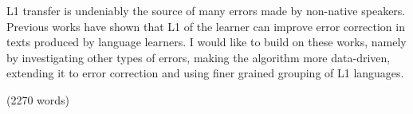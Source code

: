 \documentclass[11pt]{article}
\begin{document}
L1 transfer is undeniably the source of many errors made by non-native speakers. Previous works have shown that L1 of the learner can improve error correction in texts produced by language learners. I would like to build on these works, namely by investigating other types of errors, making the algorithm more data-driven, extending it to error correction and using finer grained grouping of L1 languages. 



(2270 words)





\end{document}
